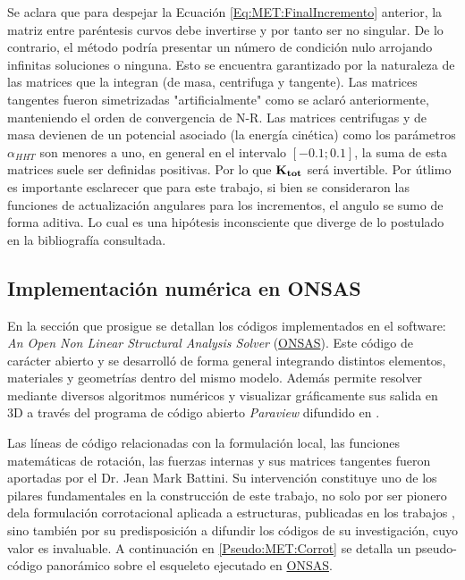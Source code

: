 Se aclara que para despejar la Ecuación \eqref{Eq:MET:FinalIncremento} anterior, la matriz entre paréntesis curvos debe invertirse y por tanto ser no singular. De lo contrario, el método podría presentar un número de condición nulo arrojando infinitas soluciones o ninguna.  Esto se encuentra garantizado por la naturaleza de las matrices que la integran (de masa, centrifuga y tangente). Las matrices tangentes fueron simetrizadas "artificialmente" como se aclaró anteriormente, manteniendo el orden de convergencia de N-R. Las matrices centrifugas y de masa devienen de un potencial asociado (la energía cinética) como los parámetros $\alpha_{HHT}$ son menores a uno, en general en el intervalo $[-0.1;0.1]$, la suma de esta matrices suele ser definidas positivas. Por lo que $\bf{K}_{tot}$ será invertible. Por útlimo es importante esclarecer que para este trabajo, si bien se consideraron las funciones de actualización angulares para los incrementos, el angulo se sumo de forma aditiva. Lo cual es una hipótesis inconsciente que diverge de lo postulado en la bibliografía consultada.  

\subsection{Implementación numérica en ONSAS}
En la sección que prosigue se detallan los códigos implementados en el software: \emph{An Open Non Linear Structural Analysis Solver} (\href{https://github.com/ONSAS/ONSAS/}{ONSAS}). Este código de carácter abierto y se desarrolló de forma general integrando distintos elementos, materiales y geometrías dentro del mismo modelo. Además permite resolver mediante diversos algoritmos numéricos y visualizar gráficamente sus salida en 3D a través del programa de código abierto \emph{Paraview} difundido en \citep{ahrens2005paraview}.

Las líneas de código relacionadas con la formulación local, las funciones matemáticas de rotación, las fuerzas internas y sus matrices tangentes fueron aportadas por el Dr. Jean Mark Battini. Su intervención constituye uno de los pilares fundamentales en la construcción de este trabajo, no solo por ser pionero dela formulación corrotacional aplicada a estructuras, publicadas en los trabajos \citep{Battini2002} \citep{Le2014}, sino también por su predisposición a difundir los códigos de su investigación, cuyo valor es invaluable. A continuación en \ref{Pseudo:MET:Corrot} se detalla un pseudo-código panorámico sobre el esqueleto ejecutado en \href{https://github.com/ONSAS/ONSAS/}{ONSAS}. 

